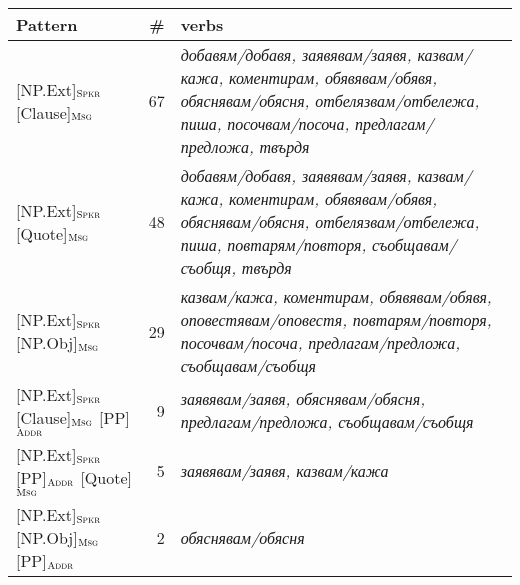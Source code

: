 \documentclass[output=paper,colorlinks,citecolor=brown]{langscibook}
\begin{document}
  \begin{table}
    \centering\footnotesize
    \begin{tabularx}{\textwidth}{ lrQ }
\lsptoprule
         Pattern  & \#  & verbs \\
\midrule
{[NP.Ext]}$_{\text{\textsc{Spkr}}}$ {[Clause]}$_{\text{\textsc{Msg}}}$ & 67 & \textit{добавям\slash добавя, заявявам\slash заявя, казвам\slash кажа, коментирам, обявявам\slash обявя, обяснявам\slash обясня, отбелязвам\slash отбележа, пиша, посочвам\slash посоча, предлагам\slash предложа, твърдя}\\

{[NP.Ext]}$_{\text{\textsc{Spkr}}}$ {[Quote]}$_{\text{\textsc{Msg}}}$ & 48 & \textit{добавям\slash добавя, заявявам\slash заявя, казвам\slash кажа, коментирам, обявявам\slash обявя, обяснявам\slash обясня, отбелязвам\slash отбележа, пиша, повтарям\slash повторя, съобщавам\slash съобщя, твърдя}\\

{[NP.Ext]}$_{\text{\textsc{Spkr}}}$ {[NP.Obj]}$_{\text{\textsc{Msg}}}$ & 29 & \textit{казвам\slash кажа, коментирам, обявявам\slash обявя, оповестявам\slash оповестя, повтарям\slash повторя, посочвам\slash посоча, предлагам\slash предложа, съобщавам\slash съобщя}\\

{[NP.Ext]}$_{\text{\textsc{Spkr}}}$ {[Clause]}$_{\text{\textsc{Msg}}}$  {[PP]}$_{\text{\textsc{Addr}}}$ & 9 & \textit{заявявам\slash заявя, обяснявам\slash обясня, предлагам\slash предложа, съобщавам\slash съобщя}\\

{[NP.Ext]}$_{\text{\textsc{Spkr}}}$ {[PP]}$_{\text{\textsc{Addr}}}$  {[Quote]}$_{\text{\textsc{Msg}}}$ & 5 & \textit{заявявам\slash заявя, казвам\slash кажа}\\



{[NP.Ext]}$_{\text{\textsc{Spkr}}}$ {[NP.Obj]}$_{\text{\textsc{Msg}}}$   {[PP]}$_{\text{\textsc{Addr}}}$ & 2 & \textit{обяснявам\slash обясня}\\



\end{tabularx}
\end{table}
\end{document}
